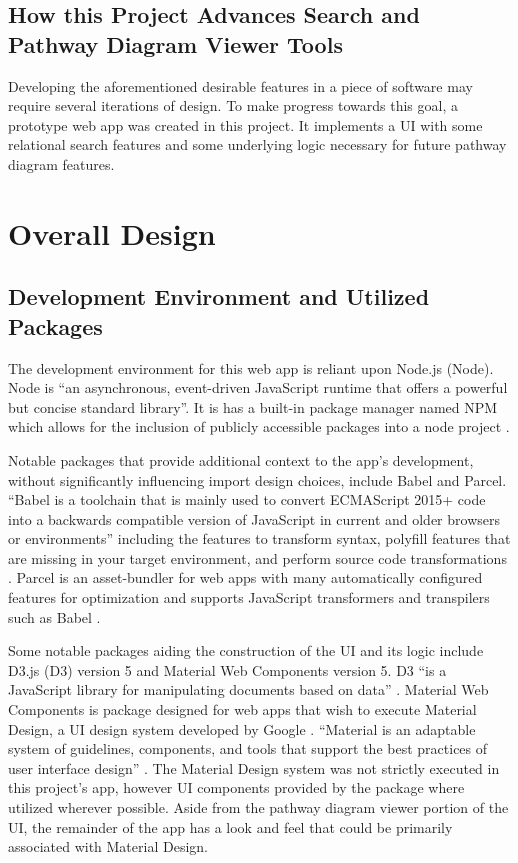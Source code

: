 \documentclass[12pt, letterpaper]{report}
\begin{document}
\section{How this Project Advances Search and Pathway Diagram Viewer Tools}
Developing the aforementioned desirable features in a piece of software may require several iterations of design. To make progress towards this goal, a prototype web app was created in this project. It implements a UI with some relational search features and some underlying logic necessary for future pathway diagram features.


\chapter{Overall Design}

\section {Development Environment and Utilized Packages}
The development environment for this web app is reliant upon Node.js (Node). Node is ``an asynchronous, event-driven JavaScript runtime that offers a powerful but concise standard library''. It is has a built-in package manager named NPM which allows for the inclusion of publicly accessible packages into a node project \cite{NodeJSInAction}.

Notable packages that provide additional context to the app's development, without significantly influencing import design choices, include Babel and Parcel. ``Babel is a toolchain that is mainly used to convert ECMAScript 2015+ code into a backwards compatible version of JavaScript in current and older browsers or environments'' including the features to transform syntax, polyfill features that are missing in your target environment, and perform source code transformations \cite {BabelDocumentation}. Parcel is an asset-bundler for web apps with many automatically configured features for optimization and supports JavaScript transformers and transpilers such as Babel \cite{ParcelDocumentation}.

Some notable packages aiding the construction of the UI and its logic include D3.js (D3) version 5 and Material Web Components version 5. D3 ``is a JavaScript library for manipulating documents based on data'' \cite{D3HomePage}. Material Web Components is package designed for web apps that wish to execute Material Design, a UI design system developed by Google \cite{MaterialComponentsWebGithub}. ``Material is an adaptable system of guidelines, components, and tools that support the best practices of user interface design'' \cite{MaterialDesignPhilosophy}. The Material Design system was not strictly executed in this project's app, however UI components provided by the package where utilized wherever possible. Aside from the pathway diagram viewer portion of the UI, the remainder of the app has a look and feel that could be primarily associated with Material Design.
\end{document}
